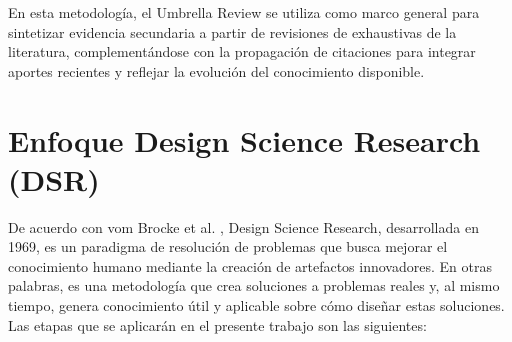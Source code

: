 En esta metodología, el Umbrella Review se utiliza como marco general para sintetizar evidencia secundaria a partir de revisiones de exhaustivas de la literatura, 
complementándose 
con la propagación de citaciones para integrar aportes recientes y 
reflejar la evolución del conocimiento disponible.







\section{Enfoque Design Science Research (DSR)}
De acuerdo con vom Brocke et al. \cite{vomBrocke2020}, Design Science Research, desarrollada en 1969, es un paradigma de resolución de problemas que busca mejorar el conocimiento humano mediante la creación de artefactos innovadores. En otras palabras, es una metodología que crea soluciones a problemas reales y, al mismo tiempo, genera conocimiento útil y aplicable sobre cómo diseñar estas soluciones. Las etapas que se aplicarán en el presente trabajo son las siguientes:

